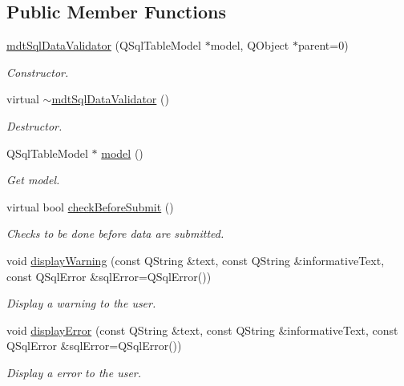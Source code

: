 \subsection*{Public Member Functions}
\begin{DoxyCompactItemize}
\item 
\hyperlink{classmdt_sql_data_validator_a609bc3f4378f092a74e47907dc3e0222}{mdtSqlDataValidator} (QSqlTableModel $\ast$model, QObject $\ast$parent=0)
\begin{DoxyCompactList}\small\item\em Constructor. \end{DoxyCompactList}\item 
\hypertarget{classmdt_sql_data_validator_a2d1348a7035ac4fcf4f4cd47a6c2fa52}{
virtual \hyperlink{classmdt_sql_data_validator_a2d1348a7035ac4fcf4f4cd47a6c2fa52}{$\sim$mdtSqlDataValidator} ()}
\label{classmdt_sql_data_validator_a2d1348a7035ac4fcf4f4cd47a6c2fa52}

\begin{DoxyCompactList}\small\item\em Destructor. \end{DoxyCompactList}\item 
QSqlTableModel $\ast$ \hyperlink{classmdt_sql_data_validator_a4970687a15ac3c8099c13164fba58291}{model} ()
\begin{DoxyCompactList}\small\item\em Get model. \end{DoxyCompactList}\item 
virtual bool \hyperlink{classmdt_sql_data_validator_af291c18e9c8994085ed4664db3fdcb7c}{checkBeforeSubmit} ()
\begin{DoxyCompactList}\small\item\em Checks to be done before data are submitted. \end{DoxyCompactList}\item 
void \hyperlink{classmdt_sql_data_validator_aef49b35ed8861accd9547b35aabc4ef4}{displayWarning} (const QString \&text, const QString \&informativeText, const QSqlError \&sqlError=QSqlError())
\begin{DoxyCompactList}\small\item\em Display a warning to the user. \end{DoxyCompactList}\item 
void \hyperlink{classmdt_sql_data_validator_a9d21a05e4e426235c908ba16437e9554}{displayError} (const QString \&text, const QString \&informativeText, const QSqlError \&sqlError=QSqlError())
\begin{DoxyCompactList}\small\item\em Display a error to the user. \end{DoxyCompactList}\end{DoxyCompactItemize}


